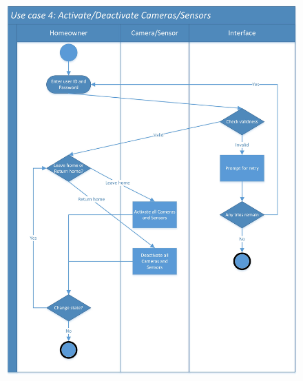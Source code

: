 \documentclass[twoside,11pt]{article}
\begin{document}
\begin{figure}[H]
    \centering
    \includegraphics[width=1\columnwidth]{SwimLaneDiagram/Usecase_4.jpg}
\end{figure}
\newpage
\end{document}
